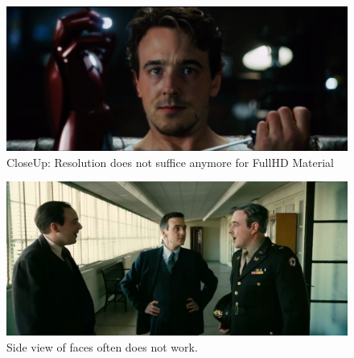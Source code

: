 \documentclass[
  a4paper,  %
  twoside,  %
  bibliography=totoc,
  headsepline,
  cleardoublepage=empty,
  parskip=half,
  draft=false
]{scrbook}
\begin{document}
\begin{figure}[h]
  \centering
  \includegraphics[width=1\textwidth]{./graphics/images/inswapper/iron-man-too-close.png}
  \caption{CloseUp: Resolution does not suffice anymore for FullHD Material}
\end{figure}
\begin{figure}[h]
  \centering
  \includegraphics[width=1\textwidth]{./graphics/images/inswapper/oppenheimer1.png}
  \caption{Side view of faces often does not work.}
\end{figure}
\end{document}
